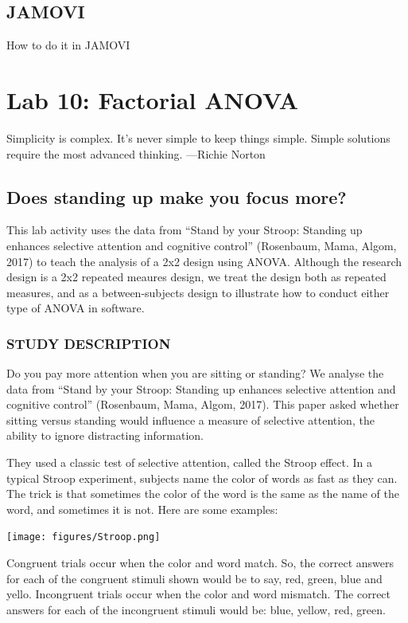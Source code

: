 \documentclass[]{book}
\begin{document}
\section{JAMOVI}\label{jamovi-9}

How to do it in JAMOVI

\chapter{Lab 10: Factorial ANOVA}\label{lab-10-factorial-anova}

{ Simplicity is complex. It's never simple to keep things simple. Simple
solutions require the most advanced thinking. ---Richie Norton }

\section{Does standing up make you focus
more?}\label{does-standing-up-make-you-focus-more}

This lab activity uses the data from ``Stand by your Stroop: Standing up
enhances selective attention and cognitive control'' (Rosenbaum, Mama,
Algom, 2017) to teach the analysis of a 2x2 design using ANOVA. Although
the research design is a 2x2 repeated meaures design, we treat the
design both as repeated measures, and as a between-subjects design to
illustrate how to conduct either type of ANOVA in software.

\subsection{STUDY DESCRIPTION}\label{study-description-4}

Do you pay more attention when you are sitting or standing? We analyse
the data from ``Stand by your Stroop: Standing up enhances selective
attention and cognitive control'' (Rosenbaum, Mama, Algom, 2017). This
paper asked whether sitting versus standing would influence a measure of
selective attention, the ability to ignore distracting information.

They used a classic test of selective attention, called the Stroop
effect. In a typical Stroop experiment, subjects name the color of words
as fast as they can. The trick is that sometimes the color of the word
is the same as the name of the word, and sometimes it is not. Here are
some examples:

\texttt{[image: figures/Stroop.png]}

Congruent trials occur when the color and word match. So, the correct
answers for each of the congruent stimuli shown would be to say, red,
green, blue and yello. Incongruent trials occur when the color and word
mismatch. The correct answers for each of the incongruent stimuli would
be: blue, yellow, red, green.
\end{document}
